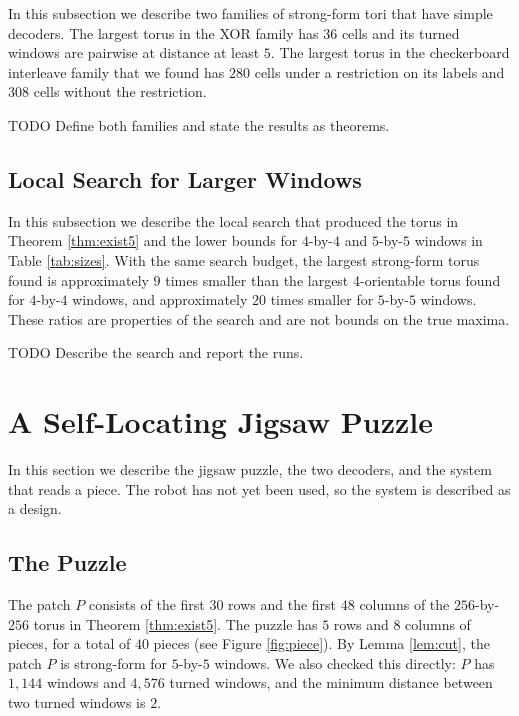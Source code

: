 \documentclass{lipics-v2021}
\newcommand{\todo}[1]{{\color{blue}TODO #1}}
\begin{document}
In this subsection we describe two families of strong-form tori that have simple decoders.
The largest torus in the XOR family has $36$ cells and its turned windows are pairwise at distance at least $5$.
The largest torus in the checkerboard interleave family that we found has $280$ cells under a restriction on its labels and $308$ cells without the restriction.

\todo{Define both families and state the results as theorems.}

\subsection{Local Search for Larger Windows}
\label{sec:constructions_search}

In this subsection we describe the local search that produced the torus in Theorem \ref{thm:exist5} and the lower bounds for $4$-by-$4$ and $5$-by-$5$ windows in Table \ref{tab:sizes}.
With the same search budget, the largest strong-form torus found is approximately $9$ times smaller than the largest 4-orientable torus found for $4$-by-$4$ windows, and approximately $20$ times smaller for $5$-by-$5$ windows.
These ratios are properties of the search and are not bounds on the true maxima.

\todo{Describe the search and report the runs.}


\section{A Self-Locating Jigsaw Puzzle}
\label{sec:jigsaw}

In this section we describe the jigsaw puzzle, the two decoders, and the system that reads a piece.
The robot has not yet been used, so the system is described as a design.

\subsection{The Puzzle}
\label{sec:jigsaw_puzzle}

The patch $P$ consists of the first $30$ rows and the first $48$ columns of the $256$-by-$256$ torus in Theorem \ref{thm:exist5}.
The puzzle has $5$ rows and $8$ columns of pieces, for a total of $40$ pieces (see Figure \ref{fig:piece}).
By Lemma \ref{lem:cut}, the patch $P$ is strong-form for $5$-by-$5$ windows.
We also checked this directly: $P$ has $1{,}144$ windows and $4{,}576$ turned windows, and the minimum distance between two turned windows is $2$.
\end{document}
